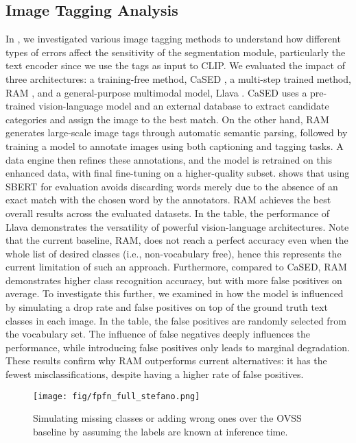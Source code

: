 \subsection{Image Tagging Analysis}\label{sec:tagging}
In , we investigated various image tagging methods to understand how different types of errors affect the sensitivity of the segmentation module, particularly the text encoder since we use the tags as input to CLIP. We evaluated the impact of three architectures: a training-free method, CaSED \cite{conti2024vocabulary}, a multi-step trained method, RAM \cite{zhang2024recognize}, and a general-purpose multimodal model, Llava \cite{liu2024llavanext}.
CaSED %
uses a pre-trained vision-language model and an external database to extract candidate categories and assign the image to the best match. 
On the other hand, RAM %
generates large-scale image tags through automatic semantic parsing, followed by training a model to annotate images using both captioning and tagging tasks. A data engine then refines these annotations, and the model is retrained on this enhanced data, with final fine-tuning on a higher-quality subset.
 shows that using SBERT for evaluation avoids discarding words merely due to the absence of an exact match with the chosen word by the annotators. RAM achieves the best overall results across the evaluated datasets. In the table, the performance of Llava \cite{liu2024llavanext} %
demonstrates the versatility of powerful vision-language architectures. Note that the current baseline, RAM, does not reach a perfect accuracy even when the whole list of desired classes (i.e., non-vocabulary free), hence this represents the current limitation of such an approach. 
Furthermore, compared to CaSED, RAM demonstrates higher class recognition accuracy, but with more false positives on average. To investigate this further, we examined in  how the model is influenced by simulating a drop rate and false positives on top of the ground truth text classes in each image. In the table, the false positives are randomly selected from the vocabulary set. The influence of false negatives deeply influences the performance, while introducing false positives only leads to marginal degradation. These results confirm why RAM outperforms current alternatives: it has the fewest misclassifications, despite having a higher rate of false positives.

\begin{figure}
    \centering
    \texttt{[image: fig/fpfn\_full\_stefano.png]}
    \caption{Simulating missing classes or adding wrong ones over the OVSS baseline by assuming the labels are known at inference time.}
    \label{fig:miss_vs_false_sim}
\end{figure}



